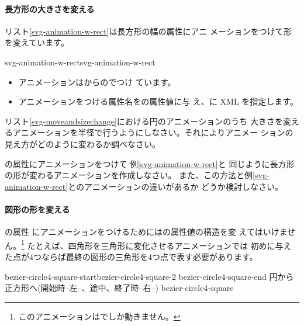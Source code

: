\paragraph{長方形の大きさを変える}
リスト\ref{svg-animation-w-rect}は長方形の幅の属性にアニ
メーションをつけて形を変えています。

{svg-animation-w-rect}{svg-animation-w-rect}
\begin{itemize}
 \item アニメーションはからのでつけ
       ています。
 \item アニメーションをつける属性名をの属性値に与
       え、に XML を指定します。
\end{itemize}
\begin{Problem}\upshape
 リスト\ref{svg-moveandsizechange}における円のアニメーションのうち
大きさを変えるアニメーションを半径で行うようにしなさい。それによりアニメー
 ションの見え方がどのように変わるか調べなさい。
\end{Problem}
\begin{Problem}\upshape
{}の属性にアニメーションをつけて
例\ref{svg-animation-w-rect}と
 同じように長方形の形が変わるアニメーションを作成しなさい。
また、この方法と例\ref{svg-animation-w-rect}とのアニメーションの違いがあるか
 どうか検討しなさい。
\end{Problem}
\paragraph{図形の形を変える}の属性
にアニメーションをつけるためにはの属性値の構造を変
えてはいけません。\footnote{このアニメーションは\Opera でしか動きません。}
たとえば、四角形を三角形に変化させるアニメーションでは
初めに与えた点が4つならば最終の図形の三角形を4つ点で表す必要があります。

%

{{bezier-circle4-square-start}{bezier-circle4-square-2}%
{bezier-circle4-square-end}}
{円から正方形へ(開始時--左--、途中、終了時--右--)}
{bezier-circle4-square} 

